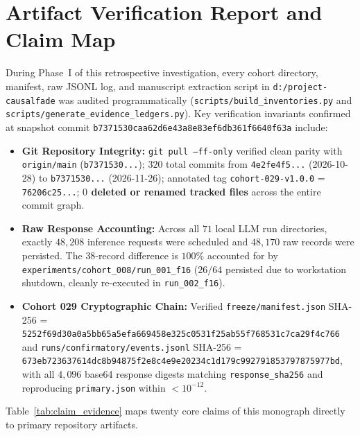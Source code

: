 
\chapter{Artifact Verification Report and Claim Map}\label{app:verification}
During Phase~I of this retrospective investigation, every cohort directory, manifest, raw JSONL log, and manuscript extraction script in \texttt{d:/project-causalfade} was audited programmatically (\texttt{scripts/build\_inventories.py} and \texttt{scripts/generate\_evidence\_ledgers.py}). Key verification invariants confirmed at snapshot commit \nolinkurl{b7371530caa62d6e43a8e83ef6db361f6640f63a} include:
\begin{itemize}
  \item \textbf{Git Repository Integrity:} \texttt{git pull --ff-only} verified clean parity with \texttt{origin/main} (\texttt{b7371530...}); $320$ total commits from \texttt{4e2fe4f5...} (2026-10-28) to \texttt{b7371530...} (2026-11-26); annotated tag \texttt{cohort-029-v1.0.0} = \texttt{76206c25...}; \textbf{$0$ deleted or renamed tracked files} across the entire commit graph.
  \item \textbf{Raw Response Accounting:} Across all $71$ local LLM run directories, exactly \textbf{$48{,}208$} inference requests were scheduled and \textbf{$48{,}170$} raw records were persisted. The $38$-record difference is $100\%$ accounted for by \texttt{experiments/cohort\_008/run\_001\_f16} ($26/64$ persisted due to workstation shutdown, cleanly re-executed in \texttt{run\_002\_f16}).
  \item \textbf{Cohort 029 Cryptographic Chain:} Verified \texttt{freeze/manifest.json} SHA-256 = \nolinkurl{5252f69d30a0a5bb65a5efa669458e325c0531f25ab55f768531c7ca29f4c766} and \texttt{runs/confirmatory/events.jsonl} SHA-256 = \nolinkurl{673eb723637614dc8b94875f2e8c4e9e20234c1d179c992791853797875977bd}, with all $4{,}096$ base64 response digests matching \texttt{response\_sha256} and reproducing \texttt{primary.json} within $< 10^{-12}$.
\end{itemize}
Table~\ref{tab:claim_evidence} maps twenty core claims of this monograph directly to primary repository artifacts.



